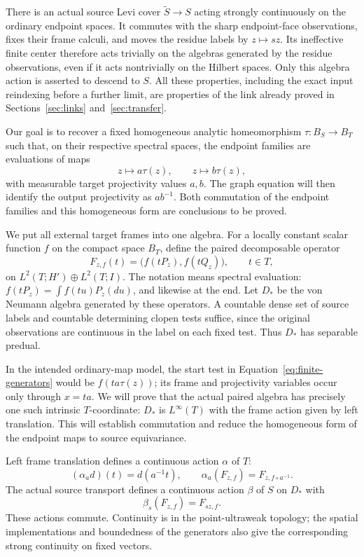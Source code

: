 There is an actual source Levi cover $\widetilde S\to S$ acting strongly
continuously on the ordinary endpoint spaces.  It commutes with the
sharp endpoint-face observations, fixes their frame calculi, and moves
the residue labels by $z\mapsto sz$.  Its ineffective finite center
therefore acts trivially on the algebras generated by the residue
observations, even if it acts nontrivially on the Hilbert spaces.
Only this algebra action is asserted to descend to $S$.
All these properties, including the exact input reindexing before a
further limit, are properties of the link already proved in
Sections~\ref{sec:links} and~\ref{sec:transfer}.

Our goal is to recover a fixed homogeneous analytic homeomorphism
$\tau:B_S\to B_T$ such that, on their respective spectral spaces, the
endpoint families are evaluations of maps
\[
 z\longmapsto a\tau(z),\qquad z\longmapsto b\tau(z),
\]
with measurable target projectivity values $a,b$.  The graph equation will
then identify the output projectivity as $ab^{-1}$.  Both commutation of
the endpoint families and this homogeneous form are conclusions to be
proved.

We put all external target frames into one algebra.  For a locally
constant scalar function $f$ on the compact space $B_T$, define the paired
decomposable operator
\begin{equation}
 F_{z,f}(t)=\bigl(f(tP_z),f(tQ_z)\bigr),\qquad t\in T,
 \label{eq:finite-generators}
\end{equation}
on $L^2(T;H')\oplus L^2(T;I)$.  The notation means spectral evaluation:
$f(tP_z)=\int f(tu)P_z(du)$, and likewise at the end.
Let $D_*$ be the von Neumann algebra generated by these operators.
A countable dense set of source labels and countable determining clopen
tests suffice, since the original observations are continuous in the
label on each fixed test.  Thus $D_*$ has separable predual.

In the intended ordinary-map model, the start test in
Equation~\eqref{eq:finite-generators} would be $f(ta\tau(z))$; its frame
and projectivity variables occur only through $x=ta$.  We will prove
that the actual paired algebra has precisely one such intrinsic
$T$-coordinate: $D_*$ is $L^\infty(T)$ with the frame action given by
left translation.  This will establish commutation and reduce the
homogeneous form of the endpoint maps to source equivariance.

Left frame translation defines a continuous action $\alpha$ of $T$:
\[
 (\alpha_a d)(t)=d(a^{-1}t),\qquad
 \alpha_a(F_{z,f})=F_{z,f\circ a^{-1}}.
\]
The actual source transport defines a continuous action $\beta$ of $S$
on $D_*$ with
\[
 \beta_s(F_{z,f})=F_{sz,f}.
\]
These actions commute.  Continuity is in the point-ultraweak topology;
the spatial implementations and boundedness of the generators also
give the corresponding strong continuity on fixed vectors.

